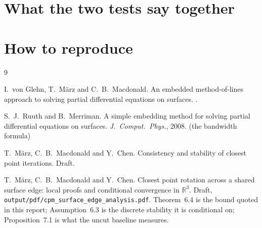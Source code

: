 \documentclass[11pt,a4paper]{article}
\begin{document}


\section{What the two tests say together}
\label{sec:together}





\section{How to reproduce}
\label{sec:repro}



\begin{thebibliography}{9}

I.~von Glehn, T.~M\"arz and C.~B.~Macdonald.
\newblock An embedded method-of-lines approach to solving partial
  differential equations on surfaces.
.

S.~J.~Ruuth and B.~Merriman.
\newblock A simple embedding method for solving partial differential
  equations on surfaces.
\newblock \emph{J.~Comput.~Phys.}, 2008.
\newblock (the bandwidth formula)

T.~M\"arz, C.~B.~Macdonald and Y.~Chen.
\newblock Consistency and stability of closest point iterations.
\newblock Draft.

T.~M\"arz, C.~B.~Macdonald and Y.~Chen.
\newblock Closest point rotation across a shared surface edge: local
  proofs and conditional convergence in $\mathbb{R}^3$.
\newblock Draft, \texttt{output/pdf/cpm\_surface\_edge\_analysis.pdf}.
\newblock Theorem~6.4 is the bound quoted in this report;
  Assumption~6.3 is the discrete stability it is conditional on;
  Proposition~7.1 is what the uncut baseline measures.

\end{thebibliography}
\end{document}
